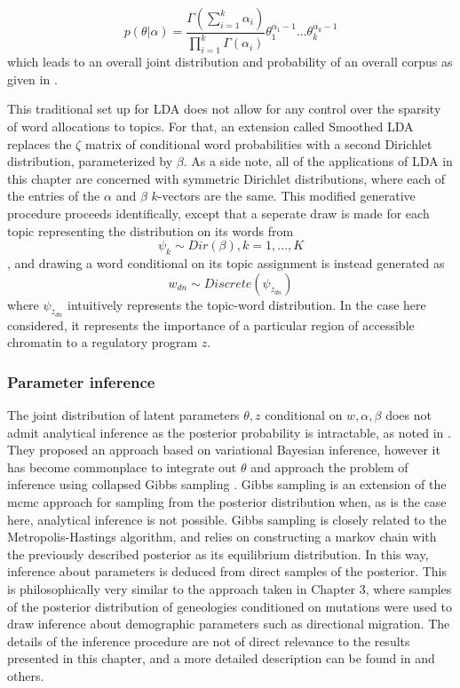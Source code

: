 $$ p(\theta | \alpha ) = \frac{\Gamma(\sum^k_{i=1} \alpha_i)}{ \prod^k_{i=1} \Gamma(\alpha_i)} \theta_1^{\alpha_1 -1} \ldots \theta_k^{\alpha_k-1} $$ which leads to an overall joint distribution and probability of an overall corpus as given in \textcite{Blei2003}.

This traditional set up for LDA does not allow for any control over the sparsity of word allocations to topics. For that, an extension called Smoothed LDA replaces the $\zeta$ matrix of conditional word probabilities with a second Dirichlet distribution, parameterized by $\beta$. As a side note, all of the applications of LDA in this chapter are concerned with symmetric Dirichlet distributions, where each of the entries of the $\alpha$ and $\beta$ $k$-vectors are the same. This modified generative procedure proceeds identifically, except that a seperate draw is made for each topic representing the distribution on its words from $$ \psi_k \sim Dir(\beta), k = 1, \ldots, K $$, and drawing a word conditional on its topic assignment is instead generated as $$w_{dn} \sim Discrete( \psi_{z_{dn}})$$ where $\psi_{z_{dn}}$ intuitively represents the topic-word distribution. In the case here considered, it represents the importance of a particular region of accessible chromatin to a regulatory program $z$.

\subsubsection{Parameter inference}

The joint distribution of latent parameters $\theta, z$ conditional on $w, \alpha, \beta$ does not admit analytical inference as the posterior probability is intractable, as noted in \textcite{Blei2003}. They proposed an approach based on variational Bayesian inference, however it has become commonplace to integrate out $\theta$ and approach the problem of inference using collapsed Gibbs sampling \cite{Qiu2014,Magnusson2018,Park2019}. Gibbs sampling is an extension of the \gls{mcmc} approach for sampling from the posterior distribution when, as is the case here, analytical inference is not possible. Gibbs sampling is closely related to the Metropolis-Hastings algorithm, and relies on constructing a markov chain with the previously described posterior as its equilibrium distribution. In this way, inference about parameters is deduced from direct samples of the posterior. This is philosophically very similar to the approach taken in Chapter 3, where samples of the posterior distribution of geneologies conditioned on mutations were used to draw inference about demographic parameters such as directional migration. The details of the inference procedure are not of direct relevance to the results presented in this chapter, and a more detailed description can be found in \textcite{Qiu2014} and others.


